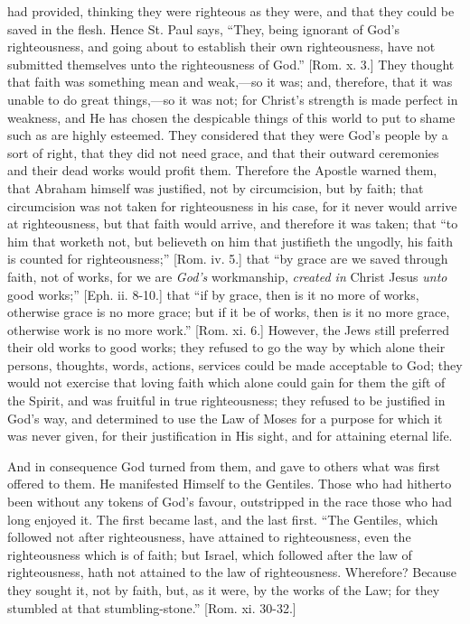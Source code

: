 had provided, thinking they were righteous as they were, and that they
could be saved in the flesh. Hence St. Paul says, ``They, being
ignorant of God's righteousness, and going about to establish their
own righteousness, have not submitted themselves unto the
righteousness of God.'' [Rom. x. 3.] They thought that faith was
something mean and weak,—so it was; and, therefore, that it was
unable to do great things,—so it was not; for Christ's strength is
made perfect in weakness, and He has chosen the despicable things of
this world to put to shame such as are highly esteemed. They
considered that they were God's people by a sort of right, that they
did not need grace, and that their outward ceremonies and their dead
works would profit them. Therefore the Apostle warned them, that
Abraham himself was justified, not by circumcision, but by faith; that
circumcision was not taken for righteousness in his case, for it never
would arrive at righteousness, but that faith would arrive, and
therefore it was taken; that ``to him that worketh not, but
believeth on him that justifieth the ungodly, his faith is counted for
righteousness;'' [Rom. iv. 5.] that ``by grace are we saved
through faith, not of works, for we are \emph{God's} workmanship, \emph{created
in} Christ Jesus \emph{unto} good works;'' [Eph. ii. 8-10.]
that ``if by grace, then is it no more of works, otherwise grace
is no more grace; but if it be of works, then is it no more grace,
otherwise work is no more work.'' [Rom. xi. 6.] However, the Jews
still preferred their old works to good works; they refused to go the
way by which alone their persons, thoughts, words, actions, services
could be made acceptable to God; they would not exercise that loving
faith which alone could gain for them the gift of the Spirit, and was
fruitful in true righteousness; they refused to be justified in God's
way, and determined to use the Law of Moses for a purpose for which it
was never given, for their justification in His sight, and for
attaining eternal life.

And in consequence God turned from them, and gave to others what
was first offered to them. He manifested Himself to the Gentiles.
Those who had hitherto been without any tokens of God's favour,
outstripped in the race those who had long enjoyed it. The first
became last, and the last first. ``The Gentiles, which followed
not after righteousness, have attained to righteousness, even the
righteousness which is of faith; but Israel, which followed after the
law of righteousness, hath not attained to the law of righteousness.
Wherefore? Because they sought it, not by faith, but, as it were, by
the works of the Law; for they stumbled at that stumbling-stone.''
[Rom. xi. 30-32.]

